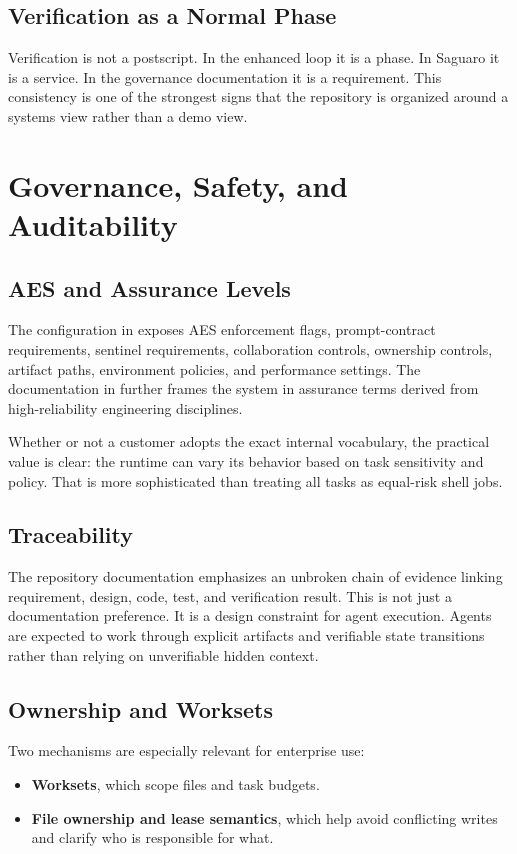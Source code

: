 \documentclass[11pt,a4paper]{article}
\begin{document}
\subsection{Verification as a Normal Phase}
Verification is not a postscript. In the enhanced loop it is a phase. In Saguaro it is a service. In the governance documentation it is a requirement. This consistency is one of the strongest signs that the repository is organized around a systems view rather than a demo view.

\section{Governance, Safety, and Auditability}
\subsection{AES and Assurance Levels}
The configuration in  exposes AES enforcement flags, prompt-contract requirements, sentinel requirements, collaboration controls, ownership controls, artifact paths, environment policies, and performance settings. The documentation in  further frames the system in assurance terms derived from high-reliability engineering disciplines.

Whether or not a customer adopts the exact internal vocabulary, the practical value is clear: the runtime can vary its behavior based on task sensitivity and policy. That is more sophisticated than treating all tasks as equal-risk shell jobs.

\subsection{Traceability}
The repository documentation emphasizes an unbroken chain of evidence linking requirement, design, code, test, and verification result. This is not just a documentation preference. It is a design constraint for agent execution. Agents are expected to work through explicit artifacts and verifiable state transitions rather than relying on unverifiable hidden context.

\subsection{Ownership and Worksets}
Two mechanisms are especially relevant for enterprise use:
\begin{itemize}
    \item \textbf{Worksets}, which scope files and task budgets.
    \item \textbf{File ownership and lease semantics}, which help avoid conflicting writes and clarify who is responsible for what.
\end{itemize}
\end{document}
